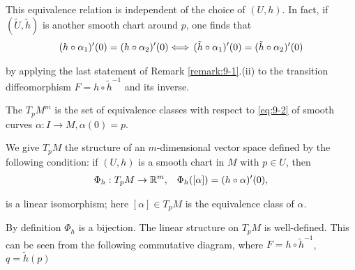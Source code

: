 This equivalence relation is independent of the choice of $(U, h)$. In fact, 
if $(\tilde U, \tilde h)$ is another smooth chart around $p$, one finds that
\begin{align*}
  (h\circ\alpha_1)'(0) = (h\circ\alpha_2)'(0)
  \Longleftrightarrow\, 
  (\tilde h\circ\alpha_1)'(0) = (\tilde h\circ\alpha_2)'(0)
\end{align*}

by applying the last statement of Remark \ref{remark:9-1}.(ii) to the transition diffeomorphism
$F=h\circ \tilde{h}^{-1}$ and its inverse.

\begin{definition}\label{def:9-2}
  The  $T_pM^m$ is the set of equivalence classes with
  respect to \eqref{eq:9-2} of smooth curves $\alpha:I\to M, \alpha(0)= p$.
\end{definition}

We give $T_pM$ the structure of an $m$-dimensional vector space defined by the
following condition: if $(U, h)$ is a smooth chart in $M$ with $p\in U$, then
\begin{align*}
  \Phi_h:T_pM\to\mathbb{R}^m, && \Phi_h([\alpha]) = (h\circ\alpha)'(0),
\end{align*}

is a linear isomorphism; here $[\alpha]\in T_pM$ is the equivalence class of $\alpha$.

By definition $\Phi_h$ is a bijection. The linear structure on $T_pM$ is well-defined.
This can be seen from the following commutative diagram, where $F=h\circ\tilde{h}^{-1}$,
$q=\tilde{h}(p)$

\begin{center}
\end{center}

